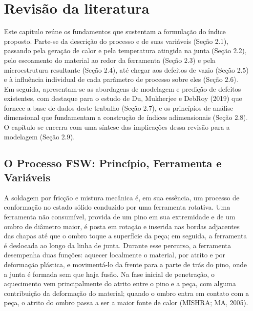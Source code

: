 \documentclass[12pt,openany]{report}
\begin{document}
\chapter{Revisão da literatura}

Este capítulo reúne os fundamentos que sustentam a formulação do índice proposto. Parte-se da descrição do processo e de suas variáveis (Seção 2.1), passando pela geração de calor e pela temperatura atingida na junta (Seção 2.2), pelo escoamento do material ao redor da ferramenta (Seção 2.3) e pela microestrutura resultante (Seção 2.4), até chegar aos defeitos de vazio (Seção 2.5) e à influência individual de cada parâmetro de processo sobre eles (Seção 2.6). Em seguida, apresentam-se as abordagens de modelagem e predição de defeitos existentes, com destaque para o estudo de Du, Mukherjee e DebRoy (2019) que fornece a base de dados deste trabalho (Seção 2.7), e os princípios de análise dimensional que fundamentam a construção de índices adimensionais (Seção 2.8). O capítulo se encerra com uma síntese das implicações dessa revisão para a modelagem (Seção 2.9).

\section{O Processo FSW: Princípio, Ferramenta e Variáveis}

A soldagem por fricção e mistura mecânica é, em sua essência, um processo de conformação no estado sólido conduzido por uma ferramenta rotativa. Uma ferramenta não consumível, provida de um pino em sua extremidade e de um ombro de diâmetro maior, é posta em rotação e inserida nas bordas adjacentes das chapas até que o ombro toque a superfície da peça; em seguida, a ferramenta é deslocada ao longo da linha de junta. Durante esse percurso, a ferramenta desempenha duas funções: aquecer localmente o material, por atrito e por deformação plástica, e movimentá-lo da frente para a parte de trás do pino, onde a junta é formada sem que haja fusão. Na fase inicial de penetração, o aquecimento vem principalmente do atrito entre o pino e a peça, com alguma contribuição da deformação do material; quando o ombro entra em contato com a peça, o atrito do ombro passa a ser a maior fonte de calor (MISHRA; MA, 2005).
\end{document}
